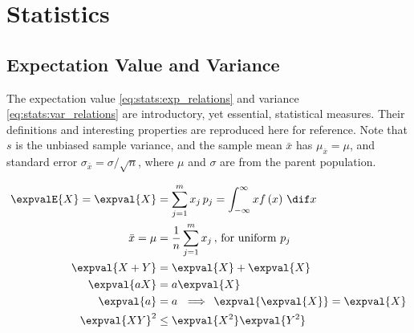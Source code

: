 \section{Statistics}
\label{additional:stats}

\subsection{Expectation Value and Variance}
\label{additional:stats:expval_and_var}

The expectation value \cref{eq:stats:exp_relations} and variance \cref{eq:stats:var_relations} are introductory, yet essential, statistical measures.
Their definitions and interesting properties are reproduced here for reference.
Note that $s$ is the unbiased sample variance,
and the sample mean $\bar{x}$ has $\mu_{\bar{x}} = \mu$, and standard error $\sigma_{\bar{x}} = \sigma / \sqrt{n}$,
where $\mu$ and $\sigma$ are from the parent population.

\begin{subequations}\label{eq:stats:exp_relations}
\begin{align}
\expvalE{X} = \expval{X} &= \sum_{j=1}^{m} x_{j} \, p_{j} = \int_{-\infty}^{\infty} x f\left(x\right) \, \dif x \label{eq:stats:exp_relations:def} \\
\bar{x} = \mu &= \frac{1}{n} \sum_{j=1}^{m} x_{j}\,,\,\text{for uniform}~p_{j} \label{eq:stats:exp_relations:mean} \\
\expval{X+Y} &= \expval{X} + \expval{X} \label{eq:stats:exp_relations:add} \\
\expval{a X} &= a \expval{X} \label{eq:stats:exp_relations:mult} \\
\expval{a} &= a \,\, \implies \, \expval{\expval{X}} = \expval{X} \label{eq:stats:exp_relations:self} \\
\expval{X Y}^{2} &\leq \expval{X^{2}} \expval{Y^{2}} \label{eq:stats:exp_relations:cbs_ineq}
\end{align}
\end{subequations}

